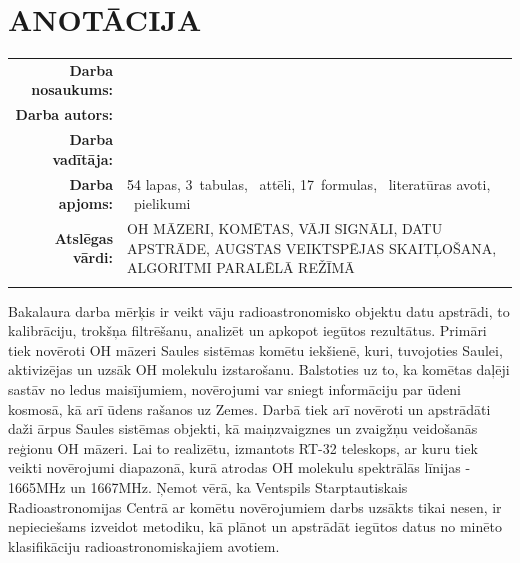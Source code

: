 \documentclass[12pt,paper=a4]{report}
\newcounter{nofappendices}
\begin{document}



\tableofcontents

\thispagestyle{empty} 
\newpage

\onehalfspace

\chapter*{ANOTĀCIJA}
\begin{tabular}{@{}r@{}l@{}}
\parbox[c]{0.3\textwidth}{\textbf{Darba nosaukums:}}&
\parbox[t]{0.65\textwidth}{} \\
\parbox[c]{0.3\textwidth}{\textbf{Darba autors:}}&
\parbox[t]{0.65\textwidth}{} \\
\parbox[c]{0.3\textwidth}{\textbf{Darba vadītāja:}}&
\parbox[t]{0.65\textwidth}{} \\
\parbox[c]{0.3\textwidth}{\textbf{Darba apjoms:}}&
\parbox[t]{0.65\textwidth}{\textcolor{black}{54} lapas, 3~tabulas,  ~attēli, 17~formulas, ~literatūras avoti, ~pielikumi} \\
\parbox[c]{0.3\textwidth}{\textbf{Atslēgas vārdi:}}&
\parbox[t]{0.65\textwidth}{ OH MĀZERI, KOMĒTAS, VĀJI SIGNĀLI, DATU APSTRĀDE, AUGSTAS VEIKTSPĒJAS SKAITĻOŠANA, ALGORITMI PARALĒLĀ REŽĪMĀ } \\
&\\

\end{tabular}

Bakalaura darba mērķis ir veikt vāju radioastronomisko objektu datu apstrādi, to kalibrāciju,  trokšņa filtrēšanu, analizēt un apkopot iegūtos rezultātus. Primāri tiek novēroti OH māzeri Saules sistēmas komētu iekšienē, kuri, tuvojoties Saulei, aktivizējas un uzsāk OH molekulu izstarošanu. Balstoties uz to, ka komētas daļēji sastāv no ledus maisījumiem, novērojumi var sniegt informāciju par ūdeni kosmosā, kā arī ūdens rašanos uz Zemes. Darbā tiek arī novēroti un apstrādāti daži ārpus Saules sistēmas objekti, kā maiņzvaigznes un zvaigžņu veidošanās reģionu OH māzeri.  Lai to realizētu, izmantots RT-32 teleskops, ar kuru tiek veikti novērojumi diapazonā, kurā atrodas OH molekulu spektrālās līnijas - 1665MHz un 1667MHz.  Ņemot vērā, ka Ventspils Starptautiskais Radioastronomijas Centrā ar komētu novērojumiem darbs uzsākts tikai nesen, ir nepieciešams izveidot metodiku, kā plānot un apstrādāt iegūtos datus no minēto klasifikāciju radioastronomiskajiem avotiem. 
\end{document}
